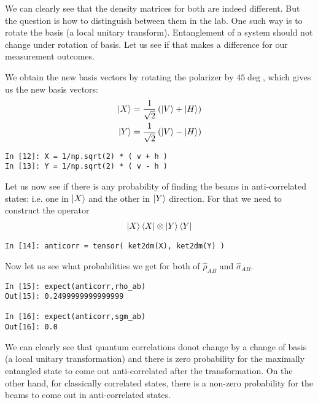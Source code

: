 \par We can clearly see that the density matrices for both are indeed different. But the question is how to distinguish between them in the lab. One such way is to rotate the basis (a local unitary transform). Entanglement of a system should not change under rotation of basis. Let us see if that makes a difference for our measurement outcomes.
\par We obtain the new basis vectors by rotating the polarizer by $45\deg$, which gives us the new basis vectors:
\begin{align*}
\ket{X} &= \frac{1}{\sqrt{2}} \left( \ket{V} + \ket{H} \right) \\
\ket{Y} &= \frac{1}{\sqrt{2}} \left( \ket{V} - \ket{H} \right)
\end{align*}

\begin{verbatim}
In [12]: X = 1/np.sqrt(2) * ( v + h )
In [13]: Y = 1/np.sqrt(2) * ( v - h )
\end{verbatim}
\par Let us now see if there is any probability of finding the beams in anti-correlated states: i.e. one in $\ket{X}$ and the other in $\ket{Y}$ direction. For that we need to construct the operator
\begin{align*}
\ket{X} \bra{X} \otimes \ket{Y} \bra{Y}
\end{align*}
\begin{verbatim}
In [14]: anticorr = tensor( ket2dm(X), ket2dm(Y) )
\end{verbatim}
\par Now let us see what probabilities we get for both of $\hat{\rho}_{AB}$ and $\hat{\sigma}_{AB}$.
\begin{verbatim}
In [15]: expect(anticorr,rho_ab)
Out[15]: 0.2499999999999999

In [16]: expect(anticorr,sgm_ab)
Out[16]: 0.0
\end{verbatim}
We can clearly see that quantum correlations donot change by a change of basis (a local unitary transformation) and there is zero probability for the maximally entangled state to come out anti-correlated after the transformation. On the other hand, for classically correlated states, there is a non-zero probability for the beams to come out in anti-correlated states.


